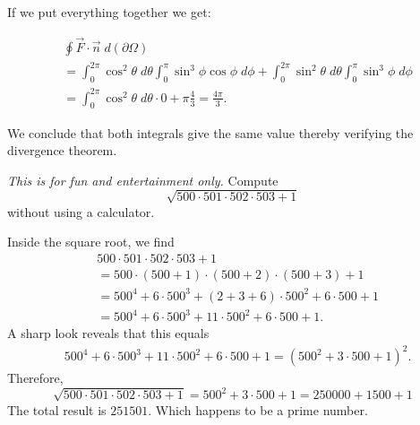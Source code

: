 \documentclass[11pt]{article}
\begin{document}
If we put everything together we get:

\begin{align*}
        &
        \oint \vec{F}\cdot \vec{n} \;d(\partial \Omega)
        \\&
        =
        \int_{0}^{2\pi}\cos^2\theta\;d\theta\int_0^{\pi}\sin^3\phi\cos\phi\;d\phi + \int_{0}^{2\pi}\sin^2\theta\;d\theta\int_0^{\pi}\sin^3\phi\;d\phi 
        \\&
        =\int_{0}^{2\pi}\cos^2\theta\;d\theta \cdot 0+ \pi\frac{4}{3} = \frac{4\pi}{3}
        .
    \end{align*}

We conclude that both integrals give the same value thereby verifying the divergence theorem.


\begin{exercise}
    \textit{This is for fun and entertainment only.}
    Compute 
    \[
        \sqrt{ 500 \cdot 501 \cdot 502 \cdot 503 + 1 }
    \]
    without using a calculator.
\end{exercise}
\begin{solution}
    Inside the square root, we find 
    \begin{align*}
        &
        500 \cdot 501 \cdot 502 \cdot 503 + 1
        \\&=
        500 \cdot (500+1) \cdot (500+2) \cdot (500+3) + 1
        \\&=
        500^4 + 6 \cdot 500^3 + ( 2 + 3 + 6 ) \cdot 500^2 + 6 \cdot 500 + 1
        \\&=
        500^4 + 6 \cdot 500^3 + 11 \cdot 500^2 + 6 \cdot 500 + 1
        .
    \end{align*}
    A sharp look reveals that this equals 
    \begin{align*}
        &
        500^4 + 6 \cdot 500^3 + 11 \cdot 500^2 + 6 \cdot 500 + 1
        =
        ( 500^2 + 3 \cdot 500 + 1 )^2
        .
    \end{align*}
    Therefore,
    \[
        \sqrt{ 500 \cdot 501 \cdot 502 \cdot 503 + 1 } = 500^2 + 3 \cdot 500 + 1 = 250000 + 1500 + 1
    \]
    The total result is $251501$. Which happens to be a prime number.
\end{solution}
\end{document}
